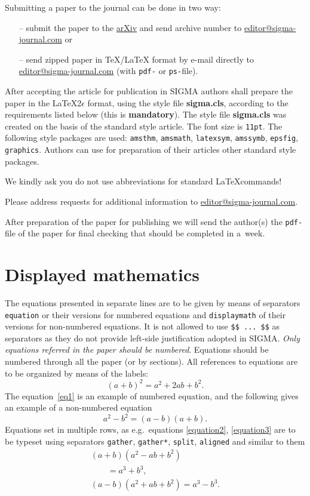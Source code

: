 \documentclass[pdftex]{sigma}
\numberwithin{equation}{section}
\begin{document}
Submitting a paper to the journal can be done in two way:
\begin{enumerate}
\itemsep=0pt
\item[--] submit the paper to the \href{https://arxiv.org/}{arXiv} and send archive number to
\href{mailto:editor@sigma-journal.com}{editor@sigma-journal.com} or
\item[--] send zipped paper in TeX/LaTeX format by e-mail directly to
\href{mailto:editor@sigma-journal.com}{editor@sigma-journal.com} (with {\tt pdf-} or {\tt ps-}file).
\end{enumerate}
After accepting the article for publication in SIGMA authors shall prepare the paper
in the \LaTeX2$\epsilon$ format, using the style file
{\bf sigma.cls}, according to the requirements listed below (this is {\bf mandatory}).
The style file {\bf sigma.cls} was created on the basis of the standard style
article. The font size is {\tt 11pt}. The following style packages are used:
{\tt amsthm}, {\tt amsmath}, {\tt latexsym}, {\tt amssymb}, {\tt epsfig}, {\tt graphics}.
Authors can use for preparation of their articles
other standard style packages.

We kindly ask you do not use abbreviations for standard \LaTeX commands!

Please address requests for additional information to \href{mailto:editor@sigma-journal.com}{editor@sigma-journal.com}.

After preparation of the paper for publishing we will send
the author(s) the
{\tt pdf-}file of the paper for final checking that should
be completed in a~week.



\section{Displayed mathematics}

The equations presented in separate lines are to be given by means
of separators {\tt equation} or their versions for numbered
equations and {\tt displaymath} of their versions  for
non-numbered equations. It is not allowed to use \verb_$$ ... $$_
as separators as they do not provide left-side justification
adopted in SIGMA. {\it Only equations referred in the paper
should be numbered}. Equations should be numbered through all the
paper (or by sections). All references to equations are to be
organized by means of the labels:
\begin{equation}
(a+b)^2=a^2+2ab+b^2.\label{eq1}
\end{equation}
The equation~\eqref{eq1} is an example of numbered equation,
and the following gives an example of a non-numbered equation
\[
a^2-b^2=(a-b)(a+b).
\]
Equations set in multiple rows, as e.g.\ equations
\eqref{equation2}, \eqref{equation3}
are to be typeset using separators
{\tt gather}, {\tt gather*}, {\tt split}, {\tt aligned} and similar to them
\begin{gather}
(a+b)\left(a^2-ab+b^2\right)\nonumber\\
\qquad {} =a^3+b^3,\label{equation2}\\
(a-b)\left(a^2+ab+b^2\right)=a^3-b^3.\label{equation3}
\end{gather}
\end{document}
